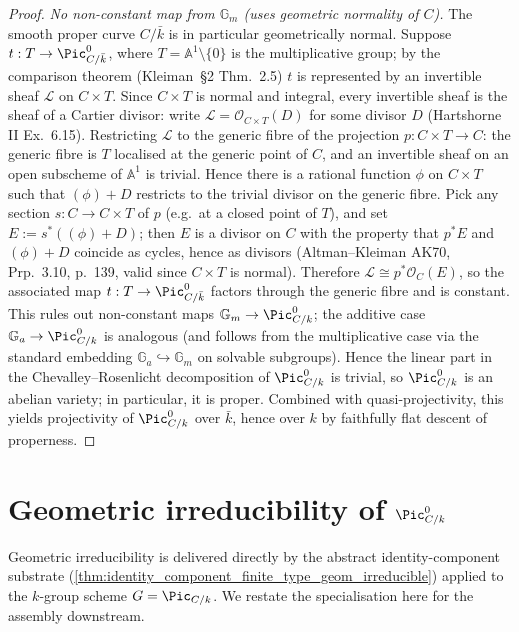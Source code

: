 \begin{proof}
  \emph{No non-constant map from \(\mathbb{G}_m\) (uses geometric
  normality of \(C\)).} The smooth proper curve \(C/\bar k\) is
  in particular geometrically normal. Suppose
  \(t : T \to \Pic^0_{C/\bar k}\), where \(T = \mathbb{A}^1
  \setminus \{0\}\) is the multiplicative group; by the comparison
  theorem (Kleiman~\S 2 Thm.~2.5) \(t\) is represented by an
  invertible sheaf \(\mathcal{L}\) on \(C \times T\). Since
  \(C \times T\) is normal and integral, every invertible sheaf is the
  sheaf of a Cartier divisor: write
  \(\mathcal{L} = \mathcal{O}_{C \times T}(D)\) for some divisor \(D\)
  (Hartshorne II Ex.~6.15). Restricting \(\mathcal{L}\) to the generic
  fibre of the projection \(p : C \times T \to C\): the generic fibre
  is \(T\) localised at the generic point of \(C\), and an invertible
  sheaf on an open subscheme of \(\mathbb{A}^1\) is trivial. Hence
  there is a rational function \(\phi\) on \(C \times T\) such that
  \((\phi) + D\) restricts to the trivial divisor on the generic
  fibre. Pick any section \(s : C \to C \times T\) of \(p\) (e.g.\ at
  a closed point of \(T\)), and set \(E := s^*((\phi) + D)\); then
  \(E\) is a divisor on \(C\) with the property that \(p^* E\) and
  \((\phi) + D\) coincide as cycles, hence as divisors (Altman--Kleiman
  AK70, Prp.~3.10, p.~139, valid since \(C \times T\) is normal).
  Therefore \(\mathcal{L} \cong p^* \mathcal{O}_C(E)\), so the
  associated map \(t : T \to \Pic^0_{C/\bar k}\) factors through the
  generic fibre and is constant. This rules out non-constant maps
  \(\mathbb{G}_m \to \Pic^0_{C/k}\); the additive case
  \(\mathbb{G}_a \to \Pic^0_{C/k}\) is analogous (and follows from the
  multiplicative case via the standard embedding
  \(\mathbb{G}_a \hookrightarrow \mathbb{G}_m\) on solvable
  subgroups). Hence the linear part in the Chevalley--Rosenlicht
  decomposition of \(\Pic^0_{C/k}\) is trivial, so \(\Pic^0_{C/k}\) is
  an abelian variety; in particular, it is proper. Combined with
  quasi-projectivity, this yields projectivity of \(\Pic^0_{C/k}\)
  over \(\bar k\), hence over \(k\) by faithfully flat descent of
  properness.
\end{proof}

\section{Geometric irreducibility of \(\Pic^0_{C/k}\)}
\label{sec:pic0_geom_irred}

Geometric irreducibility is delivered directly by the abstract
identity-component substrate
(\cref{thm:identity_component_finite_type_geom_irreducible}) applied
to the \(k\)-group scheme \(G = \Pic_{C/k}\). We restate the
specialisation here for the assembly downstream.

